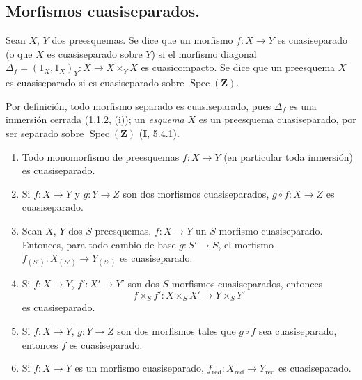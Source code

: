 \subsection{Morfismos cuasiseparados.}
\label{subsection:IV.1.2-fr}

\begin{definition}[1.2.1]
\label{IV.1.2.1-fr}
Sean $X$, $Y$ dos preesquemas. Se dice que un morfismo $f:X\to Y$ es
cuasiseparado \textup{(o que} $X$ es cuasiseparado sobre $Y$\textup{)} si el
morfismo diagonal
$\Delta_f=(1_X,1_X)_Y:X\to X\times_Y X$ es cuasicompacto. Se dice que un
preesquema $X$ es cuasiseparado si es cuasiseparado sobre
$\operatorname{Spec}(\mathbf Z)$.
\end{definition}

Por definición, todo morfismo separado es cuasiseparado, pues $\Delta_f$ es una
inmersión cerrada (1.1.2, (i)); un \emph{esquema} $X$ es un preesquema
cuasiseparado, por ser separado sobre $\operatorname{Spec}(\mathbf Z)$ (\textbf{I}, 5.4.1).

\begin{proposition}[1.2.2]
\label{IV.1.2.2-fr}
\begin{enumerate}
  \item[\textup{(i)}] Todo monomorfismo de preesquemas $f:X\to Y$ (en particular toda
  inmersión) es cuasiseparado.
  \item[\textup{(ii)}] Si $f:X\to Y$ y $g:Y\to Z$ son dos morfismos cuasiseparados,
  $g\circ f:X\to Z$ es cuasiseparado.
  \item[\textup{(iii)}] Sean $X$, $Y$ dos $S$-preesquemas, $f:X\to Y$ un $S$-morfismo
  cuasiseparado. Entonces, para todo cambio de base $g:S'\to S$, el morfismo
  $f_{(S')}:X_{(S')}\to Y_{(S')}$ es cuasiseparado.
  \item[\textup{(iv)}] Si $f:X\to Y$, $f':X'\to Y'$ son dos $S$-morfismos cuasiseparados,
  entonces
  \[
    f\times_S f':X\times_S X'\to Y\times_S Y'
  \]
  es cuasiseparado.
  \item[\textup{(v)}] Si $f:X\to Y$, $g:Y\to Z$ son dos morfismos tales que $g\circ f$
  sea cuasiseparado, entonces $f$ es cuasiseparado.
  \item[\textup{(vi)}] Si $f:X\to Y$ es un morfismo cuasiseparado,
  $f_{\mathrm{red}}:X_{\mathrm{red}}\to Y_{\mathrm{red}}$ es cuasiseparado.
\end{enumerate}
\end{proposition}

